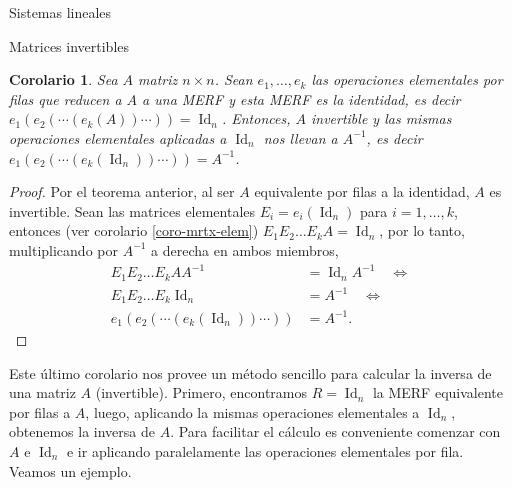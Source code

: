 \documentclass[a4paper,12pt,twoside,spanish,reqno]{amsbook}
\newtheorem{corolario}[teorema]{Corolario}
\theoremstyle{definition}
\theoremstyle{remark}
\newcommand{\Id}{\operatorname{Id}}
\begin{document}
\begin{chapter}{Sistemas lineales}
\begin{section}{Matrices invertibles}
			\begin{corolario}\label{mtrx-inv-gauss}
				Sea $A$ matriz $n \times n$. Sean $e_1,\ldots,e_k$ las operaciones elementales por filas que reducen a $A$  a una MERF y esta MERF es la identidad,  es decir $e_1(e_{2}(\cdots(e_k(A))\cdots)) =\Id_n$. Entonces, $A$ invertible y  las mismas operaciones elementales aplicadas a $\Id_n$ nos llevan a $A^{-1}$,  es decir $e_1(e_{2}(\cdots(e_k(\Id_n))\cdots)) =A^{-1}$.
			\end{corolario}
			\begin{proof} Por el teorema anterior, al ser $A$ equivalente por filas a la identidad, $A$ es invertible.  
				Sean las matrices elementales  $E_i = e_i(\Id_n)$ para $i=1,\ldots,k$,  entonces (ver corolario \ref{coro-mrtx-elem}) $E_1E_2\ldots E_kA = \Id_n$, por lo tanto, multiplicando por $A^{-1}$ a derecha en ambos miembros,    
				\begin{align*}
				E_1E_2\ldots E_kA A^{-1}&= \Id_nA^{-1} \quad \Leftrightarrow \\
				E_1E_2\ldots E_k\Id_n&= A^{-1} \quad \Leftrightarrow \\
				e_1(e_{2}(\cdots(e_k(\Id_n))\cdots)) &=A^{-1}.
				\end{align*}
			\end{proof}
			
			Este último corolario nos provee un método sencillo para calcular la inversa de una matriz $A$ (invertible). Primero,  encontramos $R = \Id_n$ la MERF  equivalente por filas a $A$, luego, aplicando la mismas operaciones elementales a $\Id_n$, obtenemos la inversa de $A$. Para facilitar el cálculo es  conveniente comenzar con $A$ e $\Id_n$ e ir aplicando paralelamente las operaciones elementales por fila. Veamos un ejemplo.


\end{section}
\end{chapter}
\end{document}
